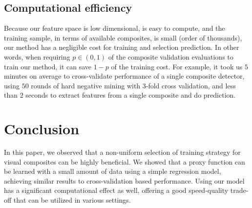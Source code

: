 \documentclass[runningheads]{llncs}
\newcommand{\RevComment} [1]{{\color{Red}{#1}}}
\begin{document}

\vspace{-0.05in}
\subsection{Computational efficiency}
Because our feature space is low dimensional, is easy to compute, and the training sample, in terms of available composites, is small (order of thousands), our method has a negligible cost for training and selection prediction. In other words, when requiring $p \in (0,1)$ of the composite validation evaluations to train our method, it can save $1-p$ of the training cost. For example, it took us $5$ minutes on average to cross-validate performance of a single composite detector, using $50$ rounds of hard negative mining with $3$-fold cross validation, and less than $2$ seconds to extract features from a single composite and do prediction. 




\vspace{-0.2cm}
\section{Conclusion}

In this paper, we observed that a non-uniform selection of training strategy for visual composites can be highly beneficial. We showed that a proxy function can be learned with a small amount of data using a simple regression model, achieving similar results to cross-validation based performance. Using our model has a significant computational effect as well, offering a good speed-quality trade-off that can be utilized in various settings.






\end{document}
